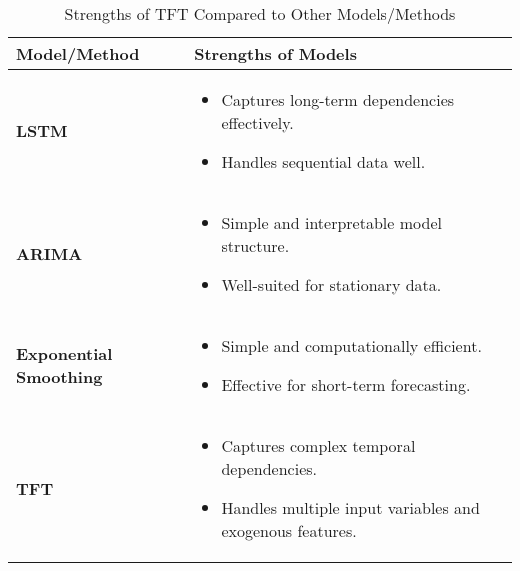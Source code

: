 	\begin{table}[!ht]
		\small %
		\centering
		\setlength{\tabcolsep}{5pt} %
		\begin{tabular}{|l|p{9cm}|} %
			\hline
			\textbf{Model/Method} & \textbf{Strengths of Models} \\ \hline
			\textbf{LSTM} & 
			\begin{itemize}
				\item Captures long-term dependencies effectively.
				\item Handles sequential data well.
			\end{itemize} \\ \hline
			\textbf{ARIMA} &
			\begin{itemize}
				\item Simple and interpretable model structure.
				\item Well-suited for stationary data.
			\end{itemize} \\ \hline
			\textbf{Exponential Smoothing} &
			\begin{itemize}
				\item Simple and computationally efficient.
				\item Effective for short-term forecasting.
			\end{itemize} \\ \hline
			\textbf{TFT} &
			\begin{itemize}
				\item Captures complex temporal dependencies.
				\item Handles multiple input variables and exogenous features.
			\end{itemize} \\ \hline
		\end{tabular}
		\caption{Strengths of TFT Compared to Other Models/Methods}
		\label{tab:comparison}
	\end{table}